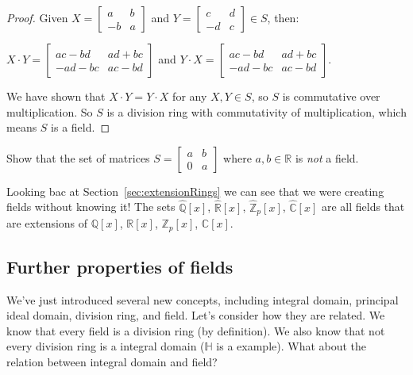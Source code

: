 \begin{example}{}
\begin{proof}
Given $X=
\begin{bmatrix}
a & b\\
-b & a
\end{bmatrix}$
and $Y=
\begin{bmatrix}
c & d\\
-d & c
\end{bmatrix}
\in S$, then: 

$X\cdot Y=
\begin{bmatrix}
ac-bd & ad+bc\\
-ad-bc & ac-bd
\end{bmatrix}$
and $Y\cdot X=
\begin{bmatrix}
ac-bd & ad+bc\\
-ad-bc & ac-bd
\end{bmatrix}. $

We have shown that $X\cdot Y=Y\cdot X$ for any $X,Y\in S$, so $S$ is commutative over multiplication.  So $S$ is a division ring with commutativity of multiplication, which means $S$ is a field.
\end{proof}
\end{example}

\begin{exercise}{}
Show that the set of matrices $S=
\begin{bmatrix}
a & b\\ 
0 & a 
\end{bmatrix}$
where $a,b\in {\mathbb R}$ is \emph{not} a field.
\end{exercise}

Looking bac at Section~\ref{sec:extensionRings} we can see that we were creating fields without knowing it!  The sets $\widehat{\mathbb{Q}}[x]$, 
$\widehat{\mathbb{R}}[x]$,
$\widehat{\mathbb{Z}}_p[x]$,
$\widehat{\mathbb{C}}[x]$
are all fields that are extensions of $\mathbb{Q}[x]$, 
$\mathbb{R}[x]$,
$\mathbb{Z}_p[x]$,
$\mathbb{C}[x]$. 

\subsection{Further properties of fields}

We've just introduced several new concepts, including integral domain, principal ideal domain, division ring, and field. Let's consider how they are related. We know that every field is a division ring (by definition). We also know that not every division ring is a integral domain (${\mathbb H}$ is a example). What about the relation between integral domain and field?


